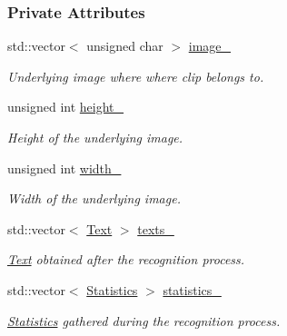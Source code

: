 \subsubsection*{Private Attributes}
\begin{CompactItemize}
\item 
\hypertarget{class_recognizer_11fc98298edb98302bdd69e71dfb8d13}{
std::vector$<$ unsigned char $>$ \hyperlink{class_recognizer_11fc98298edb98302bdd69e71dfb8d13}{image\_\-}}
\label{class_recognizer_11fc98298edb98302bdd69e71dfb8d13}

\begin{CompactList}\small\item\em Underlying image where where clip belongs to. \item\end{CompactList}\item 
\hypertarget{class_recognizer_c9da570bfac5adee1dcd253fc76ab747}{
unsigned int \hyperlink{class_recognizer_c9da570bfac5adee1dcd253fc76ab747}{height\_\-}}
\label{class_recognizer_c9da570bfac5adee1dcd253fc76ab747}

\begin{CompactList}\small\item\em Height of the underlying image. \item\end{CompactList}\item 
\hypertarget{class_recognizer_401c3d8736c8779ad69f92c4c2703c26}{
unsigned int \hyperlink{class_recognizer_401c3d8736c8779ad69f92c4c2703c26}{width\_\-}}
\label{class_recognizer_401c3d8736c8779ad69f92c4c2703c26}

\begin{CompactList}\small\item\em Width of the underlying image. \item\end{CompactList}\item 
\hypertarget{class_recognizer_853b3b92f3e02587e949acba44ec0e2e}{
std::vector$<$ \hyperlink{class_text}{Text} $>$ \hyperlink{class_recognizer_853b3b92f3e02587e949acba44ec0e2e}{texts\_\-}}
\label{class_recognizer_853b3b92f3e02587e949acba44ec0e2e}

\begin{CompactList}\small\item\em \hyperlink{class_text}{Text} obtained after the recognition process. \item\end{CompactList}\item 
\hypertarget{class_recognizer_c30a3d75c7c7cc3b3422f5aa4f594b5a}{
std::vector$<$ \hyperlink{class_statistics}{Statistics} $>$ \hyperlink{class_recognizer_c30a3d75c7c7cc3b3422f5aa4f594b5a}{statistics\_\-}}
\label{class_recognizer_c30a3d75c7c7cc3b3422f5aa4f594b5a}

\begin{CompactList}\small\item\em \hyperlink{class_statistics}{Statistics} gathered during the recognition process. \item\end{CompactList}\end{CompactItemize}


